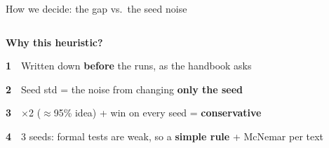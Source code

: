 \documentclass[aspectratio=169,10pt,t]{beamer}
\newcommand{\sbf}{\bfseries}
\begin{document}
\begin{frame}{How we decide: the gap vs.\ the seed noise}
\begin{columns}[T,onlytextwidth]
\begin{card}
\end{card}
\end{columns}
\vskip6pt
{\footnotesize\bfseries\color{navy}Why this heuristic?}\par\vskip3pt
\begin{tcbraster}[raster columns=4,raster equal height,raster column skip=5pt]
  \begin{softcard}{\scriptsize{\bfseries\color{navy}1}\ \ Written down {\sbf before} the runs, as the handbook asks}\end{softcard}
  \begin{softcard}{\scriptsize{\bfseries\color{navy}2}\ \ Seed std = the noise from changing {\sbf only the seed}}\end{softcard}
  \begin{softcard}{\scriptsize{\bfseries\color{navy}3}\ \ $\times$2 ($\approx$95\% idea) + win on every seed = {\sbf conservative}}\end{softcard}
  \begin{softcard}{\scriptsize{\bfseries\color{navy}4}\ \ 3 seeds: formal tests are weak, so a {\sbf simple rule} + McNemar per text}\end{softcard}
\end{tcbraster}
\end{frame}

\end{document}
